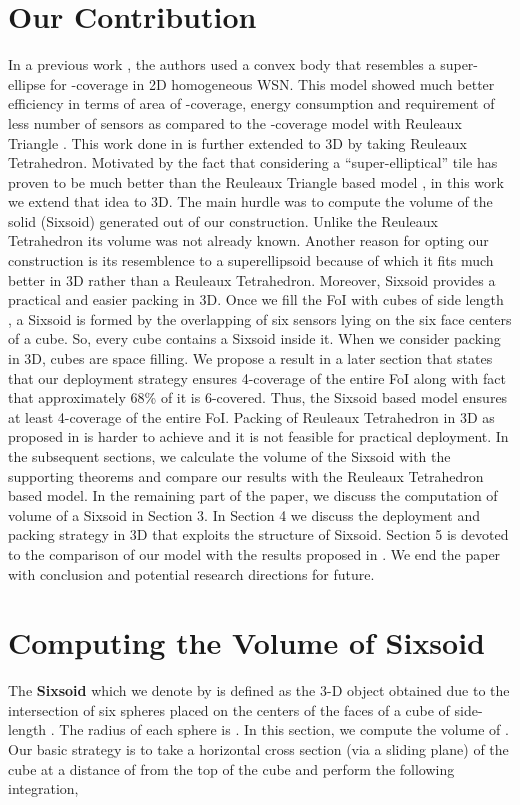 \documentclass[conference]{IEEEtran}
\begin{document}
\section{Our Contribution}\label{oc}
In a previous work \cite{MS}, the authors used a convex body that resembles a super-ellipse for -coverage in 2D homogeneous WSN. This model \cite{MS} showed much better efficiency in terms of area of -coverage, energy consumption and requirement of less number of sensors as compared to the -coverage model with Reuleaux Triangle \cite{A}. This work done in \cite{A} is further extended to 3D by taking Reuleaux Tetrahedron. Motivated by the fact that considering a ``super-elliptical'' tile has proven to be much better than the Reuleaux Triangle based model \cite{MS}, in this work we extend that idea to 3D. The main hurdle was to compute the volume of the solid 
(Sixsoid) generated out of our construction. Unlike the Reuleaux Tetrahedron its volume was not already known. Another reason for opting our construction is its resemblence to a superellipsoid because of which it fits much better in 3D rather than a Reuleaux Tetrahedron. Moreover, Sixsoid provides a practical and easier packing in 3D. Once we fill the FoI with cubes of side length , a Sixsoid is formed by the overlapping of six sensors lying on the six face centers of a cube. So, every cube contains a Sixsoid inside it. When we consider packing in 3D, cubes are space filling. We propose a result in a later section that states that our deployment strategy ensures 4-coverage of the entire FoI along with fact that approximately 68\% of it is 6-covered. Thus, the Sixsoid based model ensures at least 4-coverage of the entire FoI. Packing of Reuleaux Tetrahedron in 3D as proposed in \cite{A} is harder to achieve and it is not feasible for practical deployment. 
In the subsequent sections, we calculate the volume of the Sixsoid with the supporting theorems and compare our results with the Reuleaux Tetrahedron based model. In the remaining part of the paper, we discuss the computation of volume of a Sixsoid in Section 3. In Section 4 we discuss the deployment and packing strategy in 3D that exploits the structure of Sixsoid. Section 5 is devoted to the comparison of our model with the results proposed in \cite{AD1}. We end the paper with conclusion and potential research directions for future. 

\section{Computing the Volume of Sixsoid}
The \textbf{Sixsoid} which we denote by  is defined as the 3-D object obtained due to the intersection of
six spheres placed on the centers of the faces of a cube of side-length . The radius of
each sphere is . In this section, we compute the volume  of .
Our basic strategy is to take a horizontal cross section (via a sliding plane) of the cube at a distance of  from the top of
the cube and perform the following integration,
\end{document}

